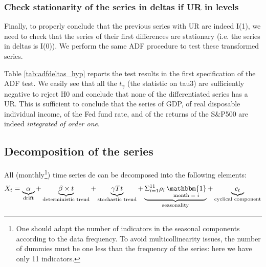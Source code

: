 \documentclass[hidelinks,12pts]{article}
\DeclareMathOperator{\1}{\mathbbm{1}}
\begin{document}




\subsubsection{Check stationarity of the series in deltas if UR in levels}

Finally, to properly conclude that the previous series with UR are indeed I(1), we need to check that the series of their first differences are stationary (i.e. the series in deltas is I(0)). 
We perform the same ADF procedure to test these transformed series. 



Table \ref{tab:adfdeltas_hyp} reports the test results in the first specification of the ADF test. 
We easily see that all the $t_\gamma$ (the statistic on tau3) are sufficiently negative to reject H0 and conclude that none of the differentiated series has a UR. 
This is sufficient to conclude that the series of GDP, of real disposable individual income, of the Fed fund rate, and of the returns of the S\&P500 are indeed \emph{integrated of order one}. 






\subsection{Decomposition of the series}

All (monthly\footnote{One should adapt the number of indicators in the seasonal components according to the data frequency. To avoid multicollinearity issues, the number of dummies must be one less than the frequency of the series: here we have only 11 indicators.}) time series de can be decomposed into the following elements: 
    \begin{equation*}
        X_t =  \underbrace{\alpha}_{\text{drift}} + \underbrace{\beta \times t}_{\text{deterministic trend}} + \underbrace{\gamma Tt}_{\text{stochastic trend}} + \underbrace{\Sigma_{i=1}^{11} \rho_i \1_{\text{month = }i}}_{\text{seasonality}} + \underbrace{c_t}_{\text{cyclical component}}
    \end{equation*}
\end{document}
